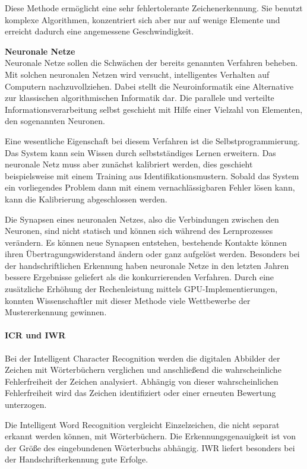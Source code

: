 
Diese Methode ermöglicht eine sehr fehlertolerante Zeichenerkennung. Sie benutzt komplexe Algorithmen, konzentriert sich aber nur auf wenige Elemente und erreicht dadurch eine angemessene Geschwindigkeit. \cite{OCRB}

\textbf{Neuronale Netze}\\
Neuronale Netze sollen die Schwächen der bereits genannten Verfahren beheben. Mit solchen neuronalen Netzen wird versucht, intelligentes Verhalten auf Computern nachzuvollziehen. Dabei stellt die Neuroinformatik eine Alternative zur klassischen algorithmischen Informatik dar. Die parallele und verteilte Informationsverarbeitung selbst geschieht mit Hilfe einer Vielzahl von Elementen, den sogenannten Neuronen. \cite{OCRB}

Eine wesentliche Eigenschaft bei diesem Verfahren ist die Selbstprogrammierung. Das System kann sein Wissen durch selbstständiges Lernen erweitern. Das neuronale Netz muss aber zunächst kalibriert werden, dies geschieht beispielsweise mit einem Training aus Identifikationsmustern. Sobald das System ein vorliegendes Problem dann mit einem vernachlässigbaren Fehler lösen kann, kann die Kalibrierung abgeschlossen werden. \cite{OCRB}

\newpage

Die Synapsen eines neuronalen Netzes, also die Verbindungen zwischen den Neuronen, sind nicht statisch und können sich während des Lernprozesses verändern. Es können neue Synapsen entstehen, bestehende Kontakte können ihren Übertragungswiderstand ändern oder ganz aufgelöst werden. Besonders bei der handschriftlichen Erkennung haben neuronale Netze in den letzten Jahren bessere Ergebnisse geliefert als die konkurrierenden Verfahren. Durch eine zusätzliche Erhöhung der Rechenleistung mittels GPU-Implementierungen, konnten Wissenschaftler mit dieser Methode viele Wettbewerbe der Mustererkennung gewinnen. \cite{OCRB}

\paragraph{ICR und IWR}
Bei der Intelligent Character Recognition werden die digitalen Abbilder der Zeichen mit Wörterbüchern verglichen und anschließend  die wahrscheinliche Fehlerfreiheit der Zeichen analysiert. Abhängig von dieser wahrscheinlichen Fehlerfreiheit wird das Zeichen identifiziert oder einer erneuten Bewertung unterzogen. \cite{OCRB}

Die Intelligent Word Recognition vergleicht Einzelzeichen, die nicht separat erkannt werden können, mit Wörterbüchern. Die Erkennungsgenauigkeit ist von der Größe des eingebundenen Wörterbuchs abhängig. IWR liefert besonders bei der Handschrifterkennung gute Erfolge. \cite{OCRB}
